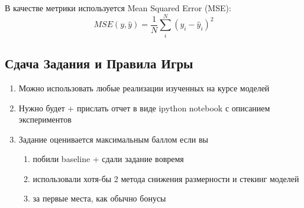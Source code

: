 \documentclass[a4paper, 12pt]{article}
\begin{document}
В качестве метрики используется Mean Squared Error (MSE):
$$MSE(y, \hat{y}) = \frac{1}{N}\sum_i^N (y_i - \hat{y}_i)^2$$

\subsection*{Сдача Задания и Правила Игры}
\begin{enumerate}
	\item Можно использовать любые реализации изученных на курсе моделей
    \item Нужно будет  + прислать отчет в виде ipython notebook с описанием экспериментов
    \item Задание оценивается максимальным баллом если вы
   	\begin{enumerate}
		\item побили baseline + сдали задание вовремя
        \item использовали хотя-бы 2 метода снижения размерности и стекинг моделей
        \item за первые места, как обычно бонусы
	\end{enumerate}
\end{enumerate}
\end{document}
